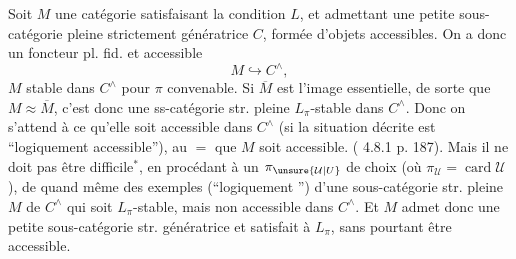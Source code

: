 Soit $M$ une catégorie satisfaisant la condition
$L$, et admettant une petite sous-catégorie
pleine strictement génératrice $C$, formée
d'objets accessibles. On a donc un
foncteur pl. fid. et accessible
\[
M\hookrightarrow C^{\wedge},
\]
$M$ stable dans $C^{\wedge}$ pour  $\pi$ convenable.
Si $\overline M$ est l'image essentielle, de sorte
que $M\approx\overline M$, c'est donc une ss-catégorie
str. pleine $L_\pi$-stable dans $C^{\wedge}$. Donc on
s'attend à ce qu'elle soit accessible
dans $C^{\wedge}$ (si la situation décrite est
``logiquement accessible''), 
  au $=$ que $M$ soit accessible.
( 4.8.1 p. 187). Mais il ne doit
pas être difficile$^{*}$, en procédant à un
 $\pi_{\unsure{\mathcal U|U}}$ de choix (où $\pi_{\mathcal U}=\operatorname{card}\mathcal U$), de
 quand même des exemples (``logiquement
'') d'une sous-catégorie
str. pleine $M$ de $C^{\wedge}$ qui soit $L_\pi$-stable,
mais non accessible dans $C^{\wedge}$. Et $M$
admet donc une petite sous-catégorie str.
génératrice  et satisfait à $L_\pi$, sans pourtant
être accessible.
